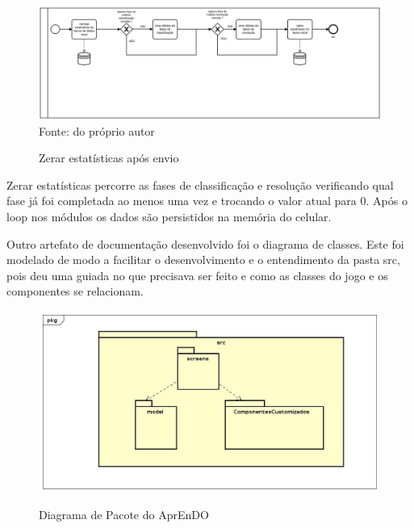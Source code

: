 \begin{figure}[H]
\centering
\caption{Zerar estatísticas após envio}
\includegraphics[width=\textwidth,height=\textheight,keepaspectratio]{figuras/processos/processo_zerar_estatisticas.png}
\label{zerar_estatisticas}
\small{Fonte: do próprio autor}
\end{figure}

Zerar estatísticas percorre as fases de classificação e resolução verificando qual fase já foi completada ao menos uma vez e trocando o valor atual para 0. Após o loop nos módulos os dados são persistidos na memória do celular.

Outro artefato de documentação desenvolvido foi o diagrama de classes. Este foi modelado de modo a facilitar o desenvolvimento e o entendimento da pasta src, pois deu uma guiada no que precisava ser feito e como as classes do jogo e os componentes se relacionam. 


\begin{figure}[H]
\caption{Diagrama de Pacote do AprEnDO}
\includegraphics[width=\textwidth,height=\textheight,keepaspectratio]{figuras/diagrama_pacote.jpg}
\label{fig:diagramaDePacote}
\end{figure}

